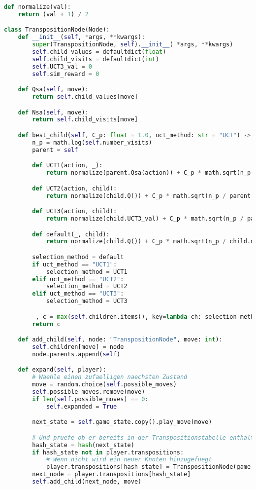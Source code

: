 \begin{lstlisting}[language=Python,label={lst:transpos-node}]
def normalize(val):
    return (val + 1) / 2

class TranspositionNode(Node):
    def __init__(self, *args, **kwargs):
        super(TranspositionNode, self).__init__( *args, **kwargs)
        self.child_values = defaultdict(float)
        self.child_visits = defaultdict(int)
        self.UCT3_val = 0
        self.sim_reward = 0

    def Qsa(self, move):
        return self.child_values[move]

    def Nsa(self, move):
        return self.child_visits[move]

    def best_child(self, C_p: float = 1.0, uct_method: str = "UCT") -> "Node":
        n_p = math.log(self.number_visits)
        parent = self

        def UCT1(action, _):
            return normalize(parent.Qsa(action)) + C_p * math.sqrt(n_p / parent.Nsa(action))

        def UCT2(action, child):
            return normalize(child.Q()) + C_p * math.sqrt(n_p / parent.Nsa(action))

        def UCT3(action, child):
            return normalize(child.UCT3_val) + C_p * math.sqrt(n_p / parent.Nsa(action))

        def default(_, child):
            return normalize(child.Q()) + C_p * math.sqrt(n_p / child.number_visits)

        selection_method = default
        if uct_method == "UCT1":
            selection_method = UCT1
        elif uct_method == "UCT2":
            selection_method = UCT2
        elif uct_method == "UCT3":
            selection_method = UCT3

        _, c = max(self.children.items(), key=lambda ch: selection_method(*ch))
        return c

    def add_child(self, node: "TranspositionNode", move: int):
        self.children[move] = node
        node.parents.append(self)

    def expand(self, player):
        # Waehle einen zufaelligen naechsten Zustand
        move = random.choice(self.possible_moves)
        self.possible_moves.remove(move)
        if len(self.possible_moves) == 0:
            self.expanded = True

        next_state = self.game_state.copy().play_move(move)

        # Und pruefe ob er bereits in der Transpositionstabelle enthalten ist
        hash_state = hash(next_state)
        if hash_state not in player.transpositions:
            # Wenn nicht wird ein neuer Knoten hinzugefuegt
            player.transpositions[hash_state] = TranspositionNode(game_state=next_state)
        next_node = player.transpositions[hash_state]
        self.add_child(next_node, move)


\end{lstlisting}
